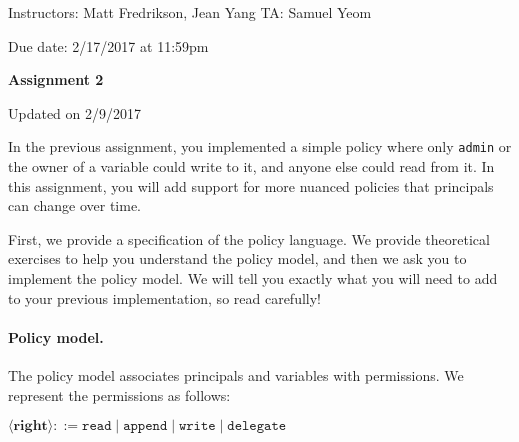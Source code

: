 \documentclass[11pt]{article}
\newcommand*{\stuname}{}
\newcommand*{\assignmentnumb}{2}
\begin{document}
\centerline{Instructors: Matt Fredrikson, Jean Yang \hfill TA: Samuel Yeom} 
\vspace{0.5ex}
Due date: 2/17/2017 at 11:59pm \\
\vspace{1.5ex}
\centerline{\Large\bf Assignment \assignmentnumb}
\vspace{0.5ex}
\centerline{\Large\bf \stuname}
\parbox{\textwidth}{\hfill \color{red} Updated on 2/9/2017}

In the previous assignment, you implemented a simple policy where only \texttt{admin} or the owner of a variable could write to it, and anyone else could read from it. In this assignment, you will add support for more nuanced policies that principals can change over time.

First, we provide a specification of the policy language. We provide theoretical exercises to help you understand the policy model, and then we ask you to implement the policy model. We will tell you exactly what you will need to add to your previous implementation, so read carefully!

\paragraph{Policy model.}
The policy model associates principals and variables with permissions. We represent the permissions as follows:

$\langle\mathbf{right}\rangle ::= \texttt{read} \mid \texttt{append} \mid \texttt{write} \mid \texttt{delegate}$
\end{document}
